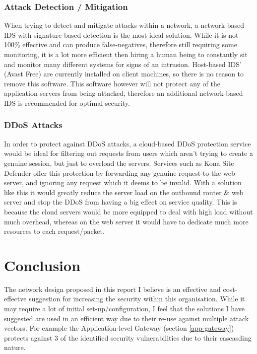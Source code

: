 \documentclass[11pt]{article}
\begin{document}
        \subsubsection{Attack Detection / Mitigation}
          When trying to detect and mitigate attacks within a network, a network-based IDS with signature-based detection is the most ideal solution. While it is not 100\% effective and can produce false-negatives, therefore still requiring some monitoring, it is a lot more efficient then hiring a human being to constantly sit and monitor many different systems for signs of an intrusion. Host-based IDS' (Avast Free) are currently installed on client machines, so there is no reason to remove this software. This software however will not protect any of the application servers from being attacked, therefore an additional network-based IDS is recommended for optimal security.

        \subsubsection{DDoS Attacks}
          In order to protect against DDoS attacks, a cloud-based DDoS protection service would be ideal for filtering out requests from users which aren't trying to create a genuine session, but just to overload the servers. Services such as Kona Site Defender \citep{akamai2018defender} offer this protection by forwarding any genuine request to the web server, and ignoring any request which it deems to be invalid. With a solution like this it would greatly reduce the server load on the outbound router \& web server and stop the DDoS from having a big effect on service quality. This is because the cloud servers would be more equipped to deal with high load without much overhead, whereas on the web server it would have to dedicate much more resources to each request/packet.

    \section{Conclusion}
      The network design proposed in this report I believe is an effective and cost-effectve suggestion for increasing the security within this organisation. While it may require a lot of initial set-up/configuration, I feel that the solutions I have suggested are used in an efficient way due to their re-use against multiple attack vectors. For example the Application-level Gateway (section \ref{app-gateway}) protects against 3 of the identified security vulnerabilities due to their cascasding nature.
\end{document}

